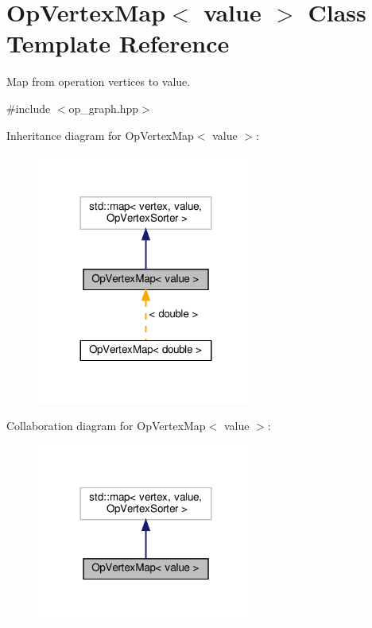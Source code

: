 \hypertarget{classOpVertexMap}{}\section{Op\+Vertex\+Map$<$ value $>$ Class Template Reference}
\label{classOpVertexMap}


Map from operation vertices to value.  




{\ttfamily \#include $<$op\+\_\+graph.\+hpp$>$}



Inheritance diagram for Op\+Vertex\+Map$<$ value $>$\+:
\nopagebreak
\begin{figure}[H]
\begin{center}
\leavevmode
\includegraphics[width=203pt]{d8/de3/classOpVertexMap__inherit__graph}
\end{center}
\end{figure}


Collaboration diagram for Op\+Vertex\+Map$<$ value $>$\+:
\nopagebreak
\begin{figure}[H]
\begin{center}
\leavevmode
\includegraphics[width=203pt]{d0/d07/classOpVertexMap__coll__graph}
\end{center}
\end{figure}
